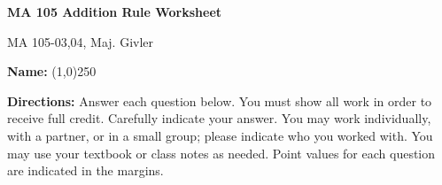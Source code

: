 \documentclass[addpoints]{exam}
\begin{document}
\begin{center}\textbf{MA 105 Addition Rule Worksheet}\end{center}

\begin{bf}
MA 105-03,04, Maj. Givler
\end{bf}

\vspace{.5 cm}

\noindent
{\bfseries Name:} \line(1,0){250}

\noindent
{\bfseries Directions:} Answer each question below. You must show all work in order to receive full credit. Carefully indicate your answer. You may work individually, with a partner, or in a small group; please indicate who you worked with. You may use your textbook or class notes as needed. Point values for each question are indicated in the margins.
\end{document}
